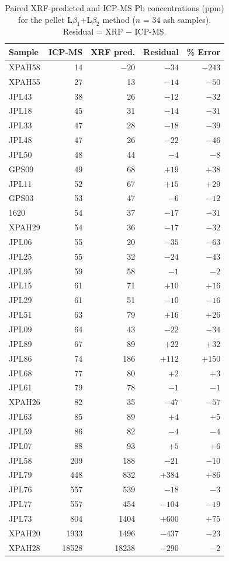 \documentclass[journal=esthag,manuscript=suppinfo]{achemso}
\begin{document}
\begin{table}[htbp]
\caption{Paired XRF-predicted and ICP-MS Pb concentrations (ppm) for the pellet L$\beta_1$+L$\beta_2$ method ($n$ = 34 ash samples). Residual = XRF $-$ ICP-MS.}
\label{tab:paired_predictions}
\centering
\footnotesize
\begin{tabular}{lrrrr}
\toprule
Sample & ICP-MS & XRF pred. & Residual & \% Error \\
\midrule
XPAH58 & 14 & $-20$ & $-34$ & $-243$ \\
XPAH55 & 27 & 13 & $-14$ & $-50$ \\
JPL43 & 38 & 26 & $-12$ & $-32$ \\
JPL18 & 45 & 31 & $-14$ & $-31$ \\
JPL33 & 47 & 28 & $-18$ & $-39$ \\
JPL48 & 47 & 26 & $-22$ & $-46$ \\
JPL50 & 48 & 44 & $-4$ & $-8$ \\
GPS09 & 49 & 68 & $+19$ & $+38$ \\
JPL11 & 52 & 67 & $+15$ & $+29$ \\
GPS03 & 53 & 47 & $-6$ & $-12$ \\
1620 & 54 & 37 & $-17$ & $-31$ \\
XPAH29 & 54 & 36 & $-17$ & $-32$ \\
JPL06 & 55 & 20 & $-35$ & $-63$ \\
JPL25 & 55 & 32 & $-24$ & $-43$ \\
JPL95 & 59 & 58 & $-1$ & $-2$ \\
JPL15 & 61 & 71 & $+10$ & $+16$ \\
JPL29 & 61 & 51 & $-10$ & $-16$ \\
JPL51 & 63 & 79 & $+16$ & $+26$ \\
JPL09 & 64 & 43 & $-22$ & $-34$ \\
JPL89 & 67 & 89 & $+22$ & $+32$ \\
JPL86 & 74 & 186 & $+112$ & $+150$ \\
JPL68 & 77 & 80 & $+2$ & $+3$ \\
JPL61 & 79 & 78 & $-1$ & $-1$ \\
XPAH26 & 82 & 35 & $-47$ & $-57$ \\
JPL63 & 85 & 89 & $+4$ & $+5$ \\
JPL59 & 86 & 82 & $-4$ & $-4$ \\
JPL07 & 88 & 93 & $+5$ & $+6$ \\
JPL58 & 209 & 188 & $-21$ & $-10$ \\
JPL79 & 448 & 832 & $+384$ & $+86$ \\
JPL76 & 557 & 539 & $-18$ & $-3$ \\
JPL77 & 557 & 454 & $-104$ & $-19$ \\
JPL73 & 804 & 1404 & $+600$ & $+75$ \\
XPAH20 & 1933 & 1496 & $-437$ & $-23$ \\
XPAH28 & 18528 & 18238 & $-290$ & $-2$ \\
\bottomrule
\end{tabular}
\end{table}
\end{document}
